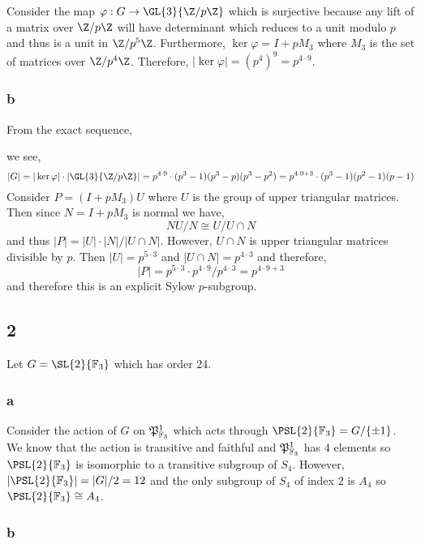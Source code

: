 \documentclass[12pt]{article}
\renewcommand{\F}{\mathbb{F}}
\begin{document}
Consider the map $\varphi : G \to \GL{3}{\Z/p \Z}$ which is surjective because any lift of a matrix over $\Z / p \Z$ will have determinant which reduces to a unit modulo $p$ and thus is a unit in $\Z / p^5 \Z$. Furthermore, $\ker{\varphi} = I + p M_3$ where $M_3$ is the set of matrices over $\Z / p^4 \Z$. Therefore, $|\ker{\varphi}| = (p^4)^9 = p^{4 \cdot 9}$.

\subsubsection{b}

From the exact sequence,
\begin{center}
\end{center}
we see,
\[ |G| = |\ker{\varphi}| \cdot |\GL{3}{\Z/p\Z}| = p^{4 \cdot 9} \cdot (p^3 - 1)(p^3 - p)(p^3 - p^2) = p^{4 \cdot 9 + 3} \cdot (p^3 - 1)(p^2 - 1)(p - 1) \]
Consider $P = (I + p M_3) U$ where $U$ is the group of upper triangular matrices. Then since $N = I + p M_3$ is normal we have,
\[ NU/N \cong U / U \cap N \]
and thus $|P| = |U| \cdot |N| /|U \cap N|$. However, $U \cap N$ is upper triangular matrices divisible by $p$. Then $|U| = p^{5 \cdot 3}$ and $|U \cap N| = p^{4 \cdot 3}$ and therefore,
\[ |P| = p^{5 \cdot 3} \cdot p^{4 \cdot 9} / p^{4 \cdot 3} = p^{4 \cdot 9 + 3} \]
and therefore this is an explicit Sylow $p$-subgroup.

\subsection{2}

Let $G = \SL{2}{\F_3}$ which has order $24$.

\subsubsection{a}

Consider the action of $G$ on $\P^1_{\F_3}$ which acts through $\PSL{2}{\F_3} = G / \{ \pm 1 \}$. We know that the action is transitive and faithful and $\P^1_{\F_3}$ has $4$ elements so $\PSL{2}{\F_3}$ is isomorphic to a transitive subgroup of $S_4$. However, $|\PSL{2}{\F_3}| = |G|/2 = 12$ and the only subgroup of $S_4$ of index $2$ is $A_4$ so $\PSL{2}{\F_3} \cong A_4$.

\subsubsection{b}
\end{document}
